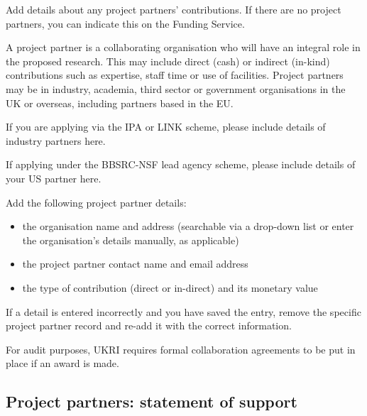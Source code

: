 \documentclass[12pt]{article}
\newenvironment{instruction}{\par\color{red}}{\par}
\begin{document}
\begin{instruction}

Add details about any project partners’ contributions. If there are no project
partners, you can indicate this on the Funding Service.

A project partner is a collaborating organisation who will have an integral
role in the proposed research. This may include direct (cash) or indirect
(in-kind) contributions such as expertise, staff time or use of facilities.
Project partners may be in industry, academia, third sector or government
organisations in the UK or overseas, including partners based in the EU.

If you are applying via the IPA or LINK scheme, please include details of
industry partners here.

If applying under the BBSRC-NSF lead agency scheme, please include details
of your US partner here.

Add the following project partner details:

\begin{itemize}

    \item the organisation name and address (searchable via a drop-down list or enter
the organisation’s details manually, as applicable)

    \item the project partner contact name and email address

    \item the type of contribution (direct or in-direct) and its monetary value
\end{itemize}

If a detail is entered incorrectly and you have saved the entry, remove the
specific project partner record and re-add it with the correct information.

For audit purposes, UKRI requires formal collaboration agreements to be put in
place if an award is made.

\end{instruction}

% 

\pagebreak
\subsection{Project partners: statement of support}
\end{document}
